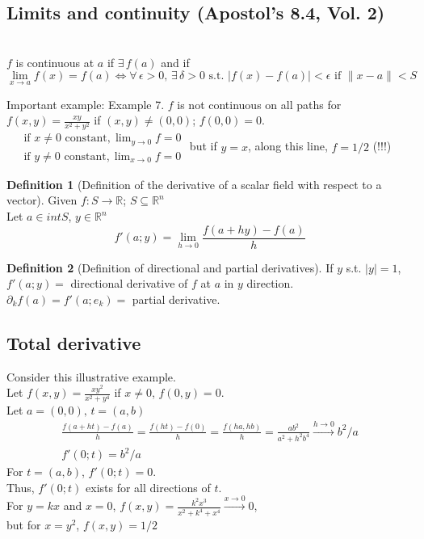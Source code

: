 \documentclass[twoside]{amsart}
\theoremstyle{plain}
\theoremstyle{definition}
\newtheorem{definition}{Definition}
\begin{document}
\subsection{ Limits and continuity (Apostol's 8.4, Vol. 2)} \quad \\

$f$ is continuous at $a$ if $\exists \, f(a)$ and if 
\[
\lim_{x\to a} f(x) = f(a) \Longleftrightarrow \forall \, \epsilon > 0, \, \exists \, \delta > 0 \text{ s.t. } |f(x) - f(a)| < \epsilon \text{ if } \| x-a \| < S
\]

Important example: Example 7. $f$ is not continuous on all paths for $f(x,y) = \frac{xy}{x^2 + y^2}$ if $(x,y) \neq (0,0)$; $f(0,0)=0$.  \\
\phantom{ example }$\begin{aligned}
  & \text{ if $x \neq 0$ constant}, \lim_{y\to 0} f = 0 \\
  & \text{ if $y\neq 0$ constant}, \lim_{x\to 0} f = 0
\end{aligned}$ but if $y=x$, along this line, $f=1/2$ (!!!)

\begin{definition}[Definition of the derivative of a scalar field with respect to a vector]
Given $f: S \to \mathbb{R}$; $S\subseteq \mathbb{R}^n$ \\
Let $a \in int{S}$, $y \in \mathbb{R}^n$
\begin{equation}
  f'(a;y) = \lim_{h\to 0} \frac{f(a+hy)-f(a)}{h}
\end{equation}
\end{definition}

\begin{definition}[Definition of directional and partial derivatives]
If $y$ s.t. $|y| = 1$, $f'(a;y) =$ directional derivative of $f$ at $a$ in $y$ direction.  \\
$\partial_k f(a) = f'(a;e_k) = $ partial derivative.  
\end{definition}

\subsection{ Total derivative }
Consider this illustrative example.  \\
\phantom{Consider} Let $f(x,y) = \frac{xy^2}{x^2 + y^4}$ if $x\neq 0$, $f(0,y)  =0$.  \\
\phantom{Consider} Let $a = (0,0), \, t = (a,b)$ 
\[
\begin{gathered}
  \frac{f(a+ht) -f(a)}{h} = \frac{f(ht) - f(0) }{h} = \frac{f(ha,hb)}{h} = \frac{ab^2 }{a^2 + h^2 b^4} \xrightarrow{ h\to 0} b^2/a \\
  f'(0;t)  = b^2 /a
\end{gathered}
\]
For $t = (a,b)$, $f'(0;t) =0$.  \\
Thus, $f'(0;t)$ exists for all directions of $t$.  \\
\phantom{Thus} For $y=kx$ and $x=0$, $f(x,y) = \frac{ k^2 x^3 }{ x^2 + k^4 + x^4 } \xrightarrow{ x\to 0} 0$, \\
\phantom{Thus For } but for $x=y^2$, $f(x,y) = 1/2$
\end{document}
